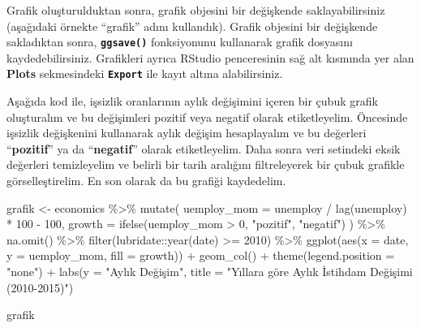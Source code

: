 \documentclass[
  letterpaper,
  DIV=11,
  numbers=noendperiod]{scrreprt}
\newenvironment{Shaded}{\begin{snugshade}}{\end{snugshade}}
\newcommand{\AttributeTok}[1]{\textcolor[rgb]{0.40,0.45,0.13}{#1}}
\newcommand{\DecValTok}[1]{\textcolor[rgb]{0.68,0.00,0.00}{#1}}
\newcommand{\FunctionTok}[1]{\textcolor[rgb]{0.28,0.35,0.67}{#1}}
\newcommand{\NormalTok}[1]{\textcolor[rgb]{0.00,0.23,0.31}{#1}}
\newcommand{\OtherTok}[1]{\textcolor[rgb]{0.00,0.23,0.31}{#1}}
\newcommand{\SpecialCharTok}[1]{\textcolor[rgb]{0.37,0.37,0.37}{#1}}
\newcommand{\StringTok}[1]{\textcolor[rgb]{0.13,0.47,0.30}{#1}}
\begin{document}

Grafik oluşturulduktan sonra, grafik objesini bir değişkende
saklayabilirsiniz (aşağıdaki örnekte ``grafik'' adını kullandık). Grafik
objesini bir değişkende sakladıktan sonra, \textbf{\texttt{ggsave()}}
fonksiyonunu kullanarak grafik dosyasını kaydedebilirsiniz. Grafikleri
ayrıca RStudio penceresinin sağ alt kısmında yer alan \textbf{Plots}
sekmesindeki \textbf{\texttt{Export}} ile kayıt altına alabilirsiniz.

Aşağıda kod ile, işsizlik oranlarının aylık değişimini içeren bir çubuk
grafik oluşturalım ve bu değişimleri pozitif veya negatif olarak
etiketleyelim. Öncesinde işsizlik değişkenini kullanarak aylık değişim
hesaplayalım ve bu değerleri ``\textbf{pozitif}'' ya da
``\textbf{negatif}'' olarak etiketleyelim. Daha sonra veri setindeki
eksik değerleri temizleyelim ve belirli bir tarih aralığını
filtreleyerek bir çubuk grafikle görselleştirelim. En son olarak da bu
grafiği kaydedelim.

\begin{Shaded}
\begin{Highlighting}[]
\NormalTok{grafik }\OtherTok{\textless{}{-}}\NormalTok{ economics }\SpecialCharTok{\%\textgreater{}\%}
  \FunctionTok{mutate}\NormalTok{(}
    \AttributeTok{uemploy\_mom =}\NormalTok{ unemploy }\SpecialCharTok{/} \FunctionTok{lag}\NormalTok{(unemploy) }\SpecialCharTok{*} \DecValTok{100} \SpecialCharTok{{-}} \DecValTok{100}\NormalTok{,}
    \AttributeTok{growth =} \FunctionTok{ifelse}\NormalTok{(uemploy\_mom }\SpecialCharTok{\textgreater{}} \DecValTok{0}\NormalTok{, }\StringTok{"pozitif"}\NormalTok{, }\StringTok{"negatif"}\NormalTok{)}
\NormalTok{  ) }\SpecialCharTok{\%\textgreater{}\%}
  \FunctionTok{na.omit}\NormalTok{() }\SpecialCharTok{\%\textgreater{}\%}
  \FunctionTok{filter}\NormalTok{(lubridate}\SpecialCharTok{::}\FunctionTok{year}\NormalTok{(date) }\SpecialCharTok{\textgreater{}=} \DecValTok{2010}\NormalTok{) }\SpecialCharTok{\%\textgreater{}\%}
  \FunctionTok{ggplot}\NormalTok{(}\FunctionTok{aes}\NormalTok{(}\AttributeTok{x =}\NormalTok{ date, }\AttributeTok{y =}\NormalTok{ uemploy\_mom, }\AttributeTok{fill =}\NormalTok{ growth)) }\SpecialCharTok{+}
  \FunctionTok{geom\_col}\NormalTok{() }\SpecialCharTok{+}
  \FunctionTok{theme}\NormalTok{(}\AttributeTok{legend.position =} \StringTok{"none"}\NormalTok{) }\SpecialCharTok{+}
  \FunctionTok{labs}\NormalTok{(}\AttributeTok{y =} \StringTok{"Aylık Değişim"}\NormalTok{,}
       \AttributeTok{title =} \StringTok{"Yıllara göre Aylık İstihdam Değişimi (2010{-}2015)"}\NormalTok{)}

\NormalTok{grafik}
\end{Highlighting}
\end{Shaded}
\end{document}
